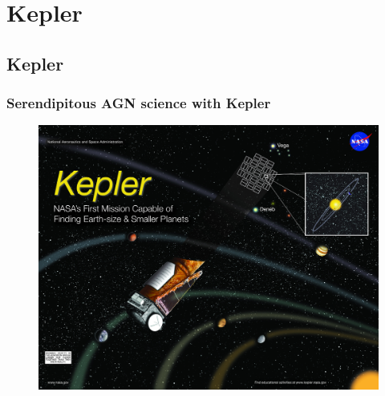 \documentclass[hyperref={pdfpagelabels=false}]{beamer}
\begin{document}
\section{Kepler} 

\subsection{Kepler}

\begin{frame}
\frametitle{Serendipitous AGN science with Kepler}
  \begin{center}
    \centering
        \begin{figure}
          \includegraphics[scale=0.75]{images/Kepler_PosterMedium.jpeg}
        \end{figure}
  \end{center}
\end{frame}
\end{document}
